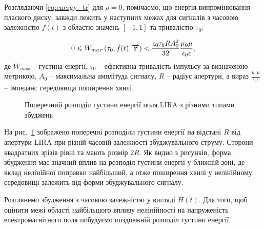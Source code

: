 Розглядаючи \ref{eq:energy_tr} для $ \rho = 0 $, помічаємо, що енергія 
випромінювання плаского диску, завжди лежить у наступних межах для 
сигналів з часовою залежністю $ f(t) $ з областю значень 
$ \left[ -1, 1 \right] $ та тривалістю $ \tau_0 $:

%
%
\begin{equation}
0 \leqslant W_{max} \left( \tau_0, f(t), \overrightarrow{\mathbf r} \right) < 
\frac{\epsilon_0 \tau_0 R A_0^2}{32} \frac{\mu_0 \mu}{\epsilon_0 \epsilon},
\end{equation}
%
де $ W_{max} $ -- густина енергії, $ \tau_0 $ -- ефективна тривалість імпульсу 
за визначеною метрикою, $ A_0 $ -- максимальна амплітуда сигналу, $ R $ -- 
радіус апертури, а вираз $ \frac{\mu_0 \mu}{\epsilon_0 \epsilon} $ -- імпеданс 
середовища поширення хвилі.

\begin{figure}
\caption{Поперечний розподіл густини енергії поля LIRA з різними типами збуджень}
\label{fig:trans_dist}
\end{figure}

На рис.~\ref{fig:trans_dist} зображено поперечні розподіли густини енергії на 
відстані $ R $ від апертури LIRA при різній часовій залежності збуджувального 
струму. Сторони квадратних зрізів рівні та мають розмір $ 2R $. Як видно з 
рисунків, форма збудження має значний вплив на розподіл густини енергії у 
ближній зоні, де вклад нелінійної поправки найбільший, а отже поширення хвилі 
у нелінійному середовищі залежить від форми збуджувального сигналу.


Розглянемо збудження з часовою залежністю у вигляді $ H(t) $. Для того, щоб 
оцінити межі області найбільшого впливу нелінійності на напруженість 
електромагнітного поля побудуємо поздовжній розподіл густини енергії. 

